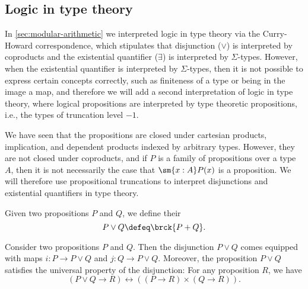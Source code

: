 \subsection{Logic in type theory}\label{sec:logic}

In \cref{sec:modular-arithmetic} we interpreted logic in type theory via the Curry-Howard correspondence, which stipulates that disjunction ($\lor$) is interpreted by coproducts and the existential quantifier ($\exists$) is interpreted by $\Sigma$-types. However, when the existential quantifier is interpreted by $\Sigma$-types, then it is not possible to express certain concepts correctly, such as finiteness of a type or being in the image a map, and therefore we will add a second interpretation of logic in type theory, where logical propositions are interpreted by type theoretic propositions, i.e., the types of truncation level $-1$.

We have seen that the propositions are closed under cartesian products, implication, and dependent products indexed by arbitrary types. However, they are not closed under coproducts, and if $P$ is a family of propositions over a type $A$, then it is not necessarily the case that $\sm{x:A}P(x)$ is a proposition. We will therefore use propositional truncations to interpret disjunctions and existential quantifiers in type theory.

\begin{defn}
  Given two propositions $P$ and $Q$, we define their 
  \begin{equation*}
    P\vee Q \defeq \brck{P+Q}.
  \end{equation*}
\end{defn}

\begin{prp}
  Consider two propositions $P$ and $Q$. Then the disjunction $P\vee Q$ comes equipped with maps $i:P\to P\vee Q$ and $j:Q\to P\vee Q$. Moreover, the proposition $P\vee Q$ satisfies the universal property of the disjunction: For any proposition $R$, we have
  \begin{equation*}
    (P\vee Q\to R)\leftrightarrow ((P\to R)\times (Q\to R)).
  \end{equation*}
\end{prp}

